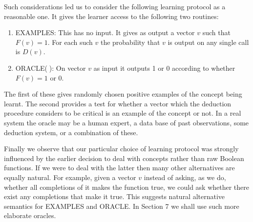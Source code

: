 Such considerations led us to consider the
following learning protocol as a reasonable one.
It gives the learner access to the following two
routines:

\begin{enumerate}
\item[(i)] EXAMPLES:  This has no input.  It gives
as output a vector $v$ such that $F(v) = 1$.  For
each such $v$ the probability that $v$ is output
on any single call is $D(v)$.

\item[(ii)] ORACLE($\;$):  On vector $v$ as input it
outputs 1 or 0 according to whether $F(v) = 1$ or 0.
\end{enumerate}

The first of these gives randomly chosen
positive examples of the concept being learnt.
The second provides a test for whether a vector
which the deduction procedure considers to be
critical is an example of the concept or not.  In
a real system the oracle may be a human expert, a
data base of past observations, some deduction
system, or a combination of these.

Finally we observe that our particular choice
of learning protocol was strongly influenced by
the earlier decision to deal with concepts rather
than raw Boolean functions.  If we were to deal
with the latter then many other alternatives are
equally natural.  For example, given a vector $v$
instead of asking, as we do, whether all completions of it makes the function true, we could ask
whether there exist any completions that make it
true.  This suggests natural alternative semantics
for EXAMPLES and ORACLE.  In Section 7 we shall
use such more elaborate oracles.
